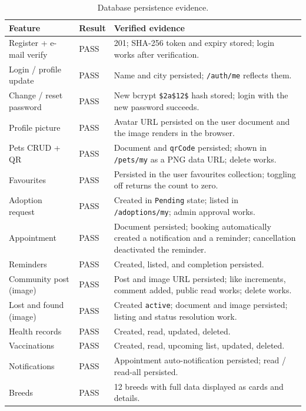 \begin{center}
\begin{longtable}{@{}p{3.4cm}p{3.6cm}p{7.6cm}@{}}
\caption{Database persistence evidence.}
\label{tab:persistence}\\
\toprule
\textbf{Feature} & \textbf{Result} & \textbf{Verified evidence} \\
\midrule
Register + e-mail verify & PASS & 201; SHA-256 token and expiry stored; login
works after verification. \\
Login / profile update & PASS & Name and city persisted; \texttt{/auth/me}
reflects them. \\
Change / reset password & PASS & New bcrypt \texttt{\$2a\$12\$} hash stored;
login with the new password succeeds. \\
Profile picture & PASS & Avatar URL persisted on the user document and the image
renders in the browser. \\
Pets CRUD + QR & PASS & Document and \texttt{qrCode} persisted; shown in
\texttt{/pets/my} as a PNG data URL; delete works. \\
Favourites & PASS & Persisted in the user favourites collection; toggling off
returns the count to zero. \\
Adoption request & PASS & Created in \texttt{Pending} state; listed in
\texttt{/adoptions/my}; admin approval works. \\
Appointment & PASS & Document persisted; booking automatically created a
notification and a reminder; cancellation deactivated the reminder. \\
Reminders & PASS & Created, listed, and completion persisted. \\
Community post (image) & PASS & Post and image URL persisted; like increments,
comment added, public read works; delete works. \\
Lost and found (image) & PASS & Created \texttt{active}; document and image
persisted; listing and status resolution work. \\
Health records & PASS & Created, read, updated, deleted. \\
Vaccinations & PASS & Created, read, upcoming list, updated, deleted. \\
Notifications & PASS & Appointment auto-notification persisted; read /
read-all persisted. \\
Breeds & PASS & 12 breeds with full data displayed as cards and details. \\
\bottomrule
\end{longtable}
\end{center}

